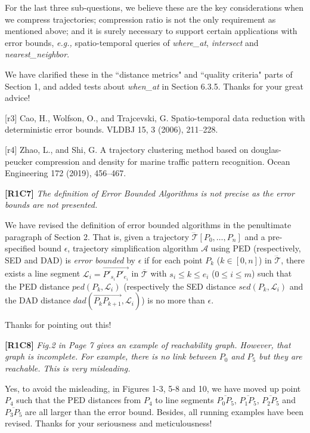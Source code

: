\documentclass{letter}
\newcommand{\eg}{\emph{e.g.,}\xspace}
\newcommand{\vv}{\overrightarrow}
\begin{document}
{For the last three sub-questions, we believe these are the key considerations when we compress trajectories; compression ratio is not the only requirement as mentioned above; and it is surely necessary to support certain applications with error bounds, \eg spatio-temporal queries of \emph{where\_at}, \emph{intersect} and \emph{nearest\_neighbor}.


We have clarified these in the ``distance metrics" and ``quality criteria" parts of Section 1, and added tests about \emph{when\_at} in Section 6.3.5. Thanks for your great advice!


[r3] Cao, H., Wolfson, O., and Trajcevski, G. Spatio-temporal data reduction with deterministic error bounds. VLDBJ 15, 3 (2006), 211–228.

[r4] Zhao, L., and Shi, G. A trajectory clustering method based on douglas-peucker compression and density for marine traffic pattern recognition. Ocean Engineering 172 (2019), 456–467.


\textbf{[R1C7]} \emph{ The definition of Error Bounded Algorithms is not precise as the error bounds are not presented. }

We have revised the definition of error bounded algorithms in the penultimate paragraph of Section 2. That is, given a trajectory $\dddot{\mathcal{T}}\left[P_0, \dots, P_n\right]$ and a pre-specified bound $\epsilon$,
trajectory simplification algorithm $\mathcal{A}$ using PED (respectively, SED and DAD) is \emph{error bounded} by $\epsilon$ if for each point $P_k$ ($k\in[0,n]$) in $\dddot{\mathcal{T}}$, there exists a line segment $\mathcal{L}_i = \vv{P'_{s_i}P'_{e_i}}$ in $\overline{\mathcal{T}}$ with $s_i \le k \le e_i$ ($0\le i\le m$) such that the PED distance $ped\left(P_k, \mathcal{L}_i\right)$  (respectively the SED distance $sed\left(P_k, \mathcal{L}_i\right)$ and the DAD distance $dad\left(\vv{P_{k}P_{k+1}}, \mathcal{L}_i\right)$) is no more than  $\epsilon$.

Thanks for pointing out this!


\textbf{[R1C8]} \emph{ Fig.2 in Page 7 gives an example of reachability graph. However, that graph is incomplete. For example, there is no link between $P_0$ and $P_5$ but they are reachable. This is very misleading. }

Yes, to avoid the misleading, in Figures 1-3, 5-8 and 10, we have moved up point $P_4$ such that the PED distances from $P_4$ to line segments $\overline{P_0P_5}$, $\overline{P_1P_5}$, $\overline{P_2P_5}$ and $\overline{P_3P_5}$ are all larger than the error bound. Besides, all running examples have been revised.
Thanks for your seriousness and meticulousness!

}
\end{document}
